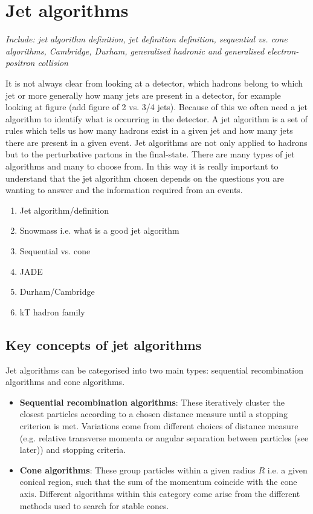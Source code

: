 \section{Jet algorithms}
\emph{Include: jet algorithm definition, jet definition definition, sequential vs. cone algorithms, Cambridge, Durham, generalised hadronic and generalised electron-positron collision}

It is not always clear from looking at a detector, which hadrons belong to which jet or more generally how many jets are present in a detector, for example looking at figure {\color{green} (add figure of 2 vs. 3/4 jets)}. Because of this we often need a jet algorithm to identify what is occurring in the detector. A jet algorithm is a set of rules which tells us how many hadrons exist in a given jet and how many jets there are present in a given event. Jet algorithms are not only applied to hadrons but to the perturbative partons in the final-state. There are many types of jet algorithms and many to choose from. In this way it is really important to understand that the jet algorithm chosen depends on the questions you are wanting to answer and the information required from an events.

\begin{enumerate}
	\item Jet algorithm/definition
	\item Snowmass i.e. what is a good jet algorithm
	\item Sequential vs. cone
	\item JADE
	\item Durham/Cambridge
	\item kT hadron family
\end{enumerate}

\subsection{Key concepts of jet algorithms}
Jet algorithms can be categorised into two main types: sequential recombination algorithms and cone algorithms.
\begin{itemize}
	\item {\textbf{Sequential recombination algorithms}}: These iteratively cluster the closest particles according to a chosen distance measure until a stopping criterion is met. Variations come from different choices of distance measure (e.g. relative transverse momenta or angular separation between particles (see later)) and stopping criteria. 
	\item {\textbf{Cone algorithms}}: These group particles within a given radius $R$ i.e. a given conical region, such that the sum of the momentum coincide with the cone axis. Different algorithms within this category come arise from the different methods used to search for stable cones.
\end{itemize}

